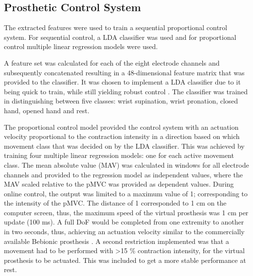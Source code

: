 \subsection{Prosthetic Control System}

The extracted features were used to train a sequential proportional control system. For sequential control, a LDA classifier was used and for proportional control multiple linear regression models were used.

A feature set was calculated for each of the eight electrode channels and subsequently concatenated resulting in a 48-dimensional feature matrix that was provided to the classifier. It was chosen to implement a LDA classifier due to it being quick to train, while still yielding robust control \cite{Englehart2003}. The classifier was trained in distinguishing between five classes: wrist supination, wrist pronation, closed hand, opened hand and rest.  

The proportional control model provided the control system with an actuation velocity proportional to the contraction intensity in a direction based on which movement class that was decided on by the LDA classifier. This was achieved by training four multiple linear regression models: one for each active movement class. The mean absolute value (MAV) was calculated in windows for all electrode channels and provided to the regression model as independent values, where the MAV scaled relative to the pMVC was provided as dependent values. During online control, the output was limited to a maximum value of 1; corresponding to the intensity of the pMVC. The distance of 1 corresponded to 1 cm on the computer screen, thus, the maximum speed of the virtual prosthesis was 1 cm per update (100 ms). A full DoF would be completed from one extremity to another in two seconds, thus, achieving an actuation velocity similar to the commercially available Bebionic prosthesis \cite{Belter2013}. A second restriction implemented was that a movement had to be performed with >15 $\%$ contraction intensity, for the virtual prosthesis to be actuated. This was included to get a more stable performance at rest. 





